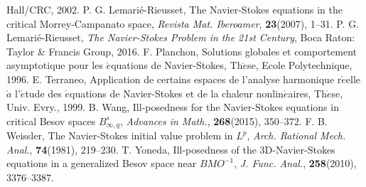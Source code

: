 \documentclass[11pt]{article}
\begin{document}
{\begin{thebibliography}{}
  Hall/CRC, 2002.
 P. G. Lemari\'{e}-Rieusset, The Navier-Stokes equations in the critical Morrey-Campanato space, \textit{Revista Mat. Iberoamer},
  \textbf{23}(2007), 1--31.
 P. G. Lemari\'{e}-Rieusset, \textit{The Navier-Stokes Problem in the 21st Century}, Boca Raton: Taylor \& Francis Group, 2016.
 F. Planchon, Solutions globales et comportement asymptotique pour les $\acute{e}$quations de Navier-Stokes, Th$\grave{e}$se, Ecole
  Polytechnique, 1996.
 E. Terraneo, Application de certains espaces de l'analyse harmonique r$\acute{e}$elle $\grave{a}$ l'$\acute{e}$tude des
  $\acute{e}$quations de Navier-Stokes et de la chaleur nonlin$\acute{e}$aires, Th$\grave{e}$se, Univ. Evry., 1999.
 B. Wang, Ill-posedness for the Navier-Stokes equations in critical Besov spaces $B^{s}_{\infty,q}$, \textit{Advances in Math.},
  \textbf{268}(2015), 350--372.
 F. B. Weissler, The Navier-Stokes initial value problem in $L^p$, \textit{Arch. Rational Mech. Anal.}, \textbf{74}(1981), 219--230.
 T. Yoneda, Ill-posedness of the 3D-Navier-Stokes equations in a generalized Besov space near $BMO^{-1}$, \textit{J. Func. Anal.},
  \textbf{258}(2010), 3376--3387.
\end{thebibliography}
}
\end{document}
